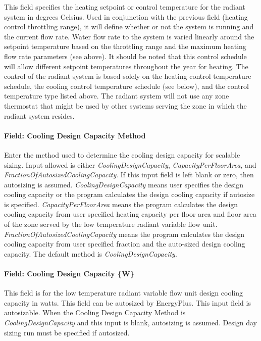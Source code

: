 This field specifies the heating setpoint or control temperature for the radiant system in degrees Celsius. Used in conjunction with the previous field (heating control throttling range), it will define whether or not the system is running and the current flow rate. Water flow rate to the system is varied linearly around the setpoint temperature based on the throttling range and the maximum heating flow rate parameters (see above). It should be noted that this control schedule will allow different setpoint temperatures throughout the year for heating. The control of the radiant system is based solely on the heating control temperature schedule, the cooling control temperature schedule (see below), and the control temperature type listed above. The radiant system will not use any zone thermostat that might be used by other systems serving the zone in which the radiant system resides.

\paragraph{Field: Cooling Design Capacity Method}\label{field-cooling-design-capacity-method-000}

Enter the method used to determine the cooling design capacity for scalable sizing. Input allowed is either \emph{CoolingDesignCapacity}, \emph{CapacityPerFloorArea}, and \emph{FractionOfAutosizedCoolingCapacity}. If this input field is left blank or zero, then autosizing is assumed. \emph{CoolingDesignCapacity} means user specifies the design cooling capacity or the program calculates the design cooling capacity if autosize is specified. \emph{CapacityPerFloorArea} means the program calculates the design cooling capacity from user specified heating capacity per floor area and floor area of the zone served by the low temperature radiant variable flow unit. \emph{FractionOfAutosizedCoolingCapacity} means the program calculates the design cooling capacity from user specified fraction and the auto-sized design cooling capacity. The default method is \emph{CoolingDesignCapacity}.

\paragraph{Field: Cooling Design Capacity \{W\}}\label{field-cooling-design-capacity-w-000}

This field is for the low temperature radiant variable flow unit design cooling capacity in watts. This field can be autosized by EnergyPlus. This input field is autosizable. When the Cooling Design Capacity Method is \emph{CoolingDesignCapacity} and this input is blank, autosizing is assumed. Design day sizing run must be specified if autosized.

